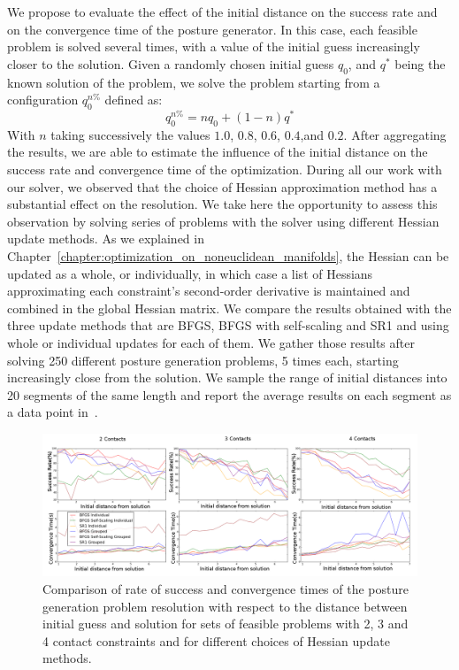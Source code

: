 We propose to evaluate the effect of the initial distance on the success rate and on the convergence time of the posture generator.
In this case, each feasible problem is solved several times, with a value of the initial guess increasingly closer to the solution.
Given a randomly chosen initial guess $q_0$, and $q^*$ being the known solution of the problem, we solve the problem starting from a configuration $q_0^{n\%}$ defined as:
\begin{equation}
  q_0^{n\%} = n q_0 + (1-n)q^*
\end{equation}
With $n$ taking successively the values $1.0$, $0.8$, $0.6$, $0.4$,and $0.2$.
After aggregating the results, we are able to estimate the influence of the initial distance on the success rate and convergence time of the optimization.
During all our work with our solver, we observed that the choice of Hessian approximation method has a substantial effect on the resolution.
We take here the opportunity to assess this observation by solving series of problems with the solver using different Hessian update methods.
As we explained in Chapter~\ref{chapter:optimization_on_noneuclidean_manifolds}, the Hessian can be updated as a whole, or individually, in which case a list of Hessians approximating each constraint's second-order derivative is maintained and combined in the global Hessian matrix.
We compare the results obtained with the three update methods that are BFGS, BFGS with self-scaling and SR1 and using whole or individual updates for each of them.
We gather those results after solving 250 different posture generation problems, 5 times each, starting increasingly close from the solution.
We sample the range of initial distances into 20 segments of the same length and report the average results on each segment as a data point in~.
\begin{figure}[htb]
\centering
  \includegraphics[width=\linewidth]{evalPG/resWithSR1Grouped.png}
  \caption{Comparison of rate of success and convergence times of the posture generation problem resolution with respect to the distance between initial guess and solution for sets of feasible problems with 2, 3 and 4 contact constraints and for different choices of Hessian update methods.}
\label{fig:evalPG}
\end{figure}

